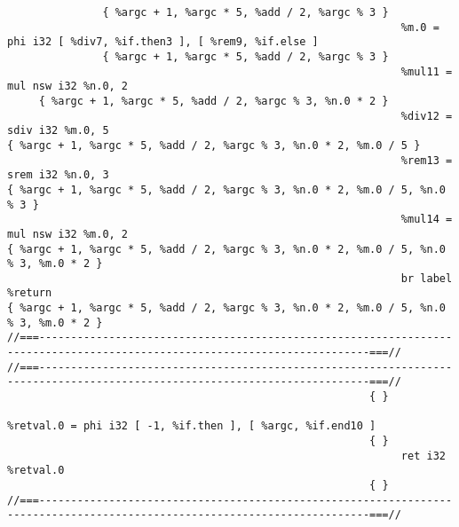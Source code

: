 \begin{verbatim}
               { %argc + 1, %argc * 5, %add / 2, %argc % 3 }
                                                              %m.0 = phi i32 [ %div7, %if.then3 ], [ %rem9, %if.else ]
               { %argc + 1, %argc * 5, %add / 2, %argc % 3 }
                                                              %mul11 = mul nsw i32 %n.0, 2
     { %argc + 1, %argc * 5, %add / 2, %argc % 3, %n.0 * 2 }
                                                              %div12 = sdiv i32 %m.0, 5
{ %argc + 1, %argc * 5, %add / 2, %argc % 3, %n.0 * 2, %m.0 / 5 }
                                                              %rem13 = srem i32 %n.0, 3
{ %argc + 1, %argc * 5, %add / 2, %argc % 3, %n.0 * 2, %m.0 / 5, %n.0 % 3 }
                                                              %mul14 = mul nsw i32 %m.0, 2
{ %argc + 1, %argc * 5, %add / 2, %argc % 3, %n.0 * 2, %m.0 / 5, %n.0 % 3, %m.0 * 2 }
                                                              br label %return
{ %argc + 1, %argc * 5, %add / 2, %argc % 3, %n.0 * 2, %m.0 / 5, %n.0 % 3, %m.0 * 2 }
//===--------------------------------------------------------------------------------------------------------------------------===//
//===--------------------------------------------------------------------------------------------------------------------------===//
                                                         { }
                                                              %retval.0 = phi i32 [ -1, %if.then ], [ %argc, %if.end10 ]
                                                         { }
                                                              ret i32 %retval.0
                                                         { }
//===--------------------------------------------------------------------------------------------------------------------------===//
\end{verbatim}
    \endgroup

